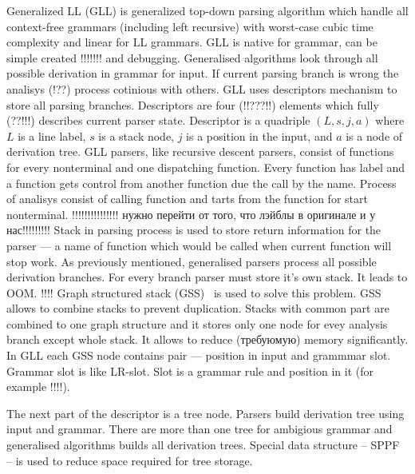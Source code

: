 \documentclass{sig-alternate} %
\begin{document}
Generalized LL (GLL) is generalized top-down parsing algorithm which handle all context-free grammars (including left recursive) with worst-case cubic time complexity and linear for LL grammars.
GLL is native for grammar, can be simple created !!!!!!! and debugging. Generalised algorithms look through all possible derivation in grammar for input. If current parsing branch is wrong the analisys (!??) process cotinious with others. 
GLL uses descriptors mechanism to store all parsing branches. Descriptors are four (!!???!!) elements which fully (??!!!) describes current parser state. Descriptor is a quadriple $(L, s, j, a)$ where $L$ is a line label, $s$ is a stack node, $j$ is a position in the input, and $a$ is a node of derivation tree. GLL parsers, like recursive descent parsers, consist of functions for every nonterminal and one dispatching function. Every function has label and a function gets control from another function due the call by the name. Process of analisys consist of calling function and tarts from the function for start nonterminal. !!!!!!!!!!!!!!!  нужно перейти от того, что лэйблы в оригинале и у нас!!!!!!!!!
Stack in parsing process is used to store return information for the parser --- a name of function which would be called when current function will stop work. As previously mentioned, generalised parsers process all possible derivation branches. For every branch parser must store it's own stack. It leads to OOM. !!!!  
Graph structured stack (GSS)~\cite{Tomita} is used to solve this problem. GSS allows to combine stacks to prevent duplication. Stacks with common part are combined to one graph structure and it stores only one node for evey analysis branch except whole stack. It allows to reduce (требуюмую) memory significantly. 
In GLL each GSS node contains pair --- position in input and grammmar slot. Grammar slot is like LR-slot. Slot is a grammar rule and position in it (for example !!!!).

The next part of the descriptor is a tree node. Parsers build derivation tree using input and grammar. There are more than one tree for ambigious grammar and generalised algorithms builds all derivation trees. Special data structure -- SPPF -- is used to reduce space required for tree storage.
\end{document}
